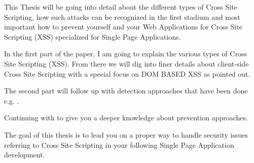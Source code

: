 This Thesis will be going into detail about the different types of Cross Site Scripting, how such attacks can be recognized in the first stadium and most important how to prevent yourself and your Web Applications for Cross Site Scripting (XSS) specialized for Single Page Applications.

In the first part of the paper, I am going to explain the various types of Cross Site Scripting (XSS). From there we will dig into finer details about client-side Cross Site Scripting with a special focus on DOM BASED XSS as \textcite[]{Shrivastava2016} pointed out.

The second part will follow up with detection approaches that have been done e.g. \textcite[]{Sarmah2018}.

Continuing with \textcite[]{Nithya2015} to give you a deeper knowledge about prevention approaches.

The goal of this thesis is to lead you on a proper way to handle security issues referring to Cross Site Scripting in your following Single Page Application development.
